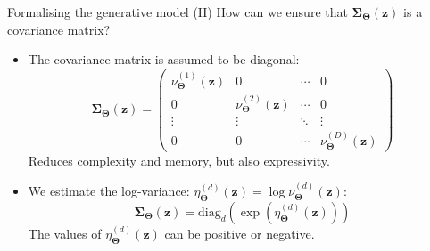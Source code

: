 \documentclass{beamer}
\newcommand{\bs}[1]{\boldsymbol{#1}}
\begin{document}
\begin{frame}{Formalising the generative model (II)}
  How can we ensure that $\bs{\Sigma}_{\bs{\Theta}}(\bs{z})$ is a covariance matrix?
  \begin{itemize}
   \item The covariance matrix is assumed to be diagonal:
   \begin{equation}\bs{\Sigma}_{\bs{\Theta}}(\bs{z}) = \left(\begin{array}{cccc} 
   \nu^{(1)}_{\bs{\Theta}}(\bs{z}) & 0 & \cdots & 0 \\ 
   0 & \nu^{(2)}_{\bs{\Theta}}(\bs{z}) & \cdots & 0 \\
   \vdots & \vdots & \ddots & \vdots \\
   0 & 0 & \cdots & \nu^{(D)}_{\bs{\Theta}}(\bs{z})
   \end{array}\right)\end{equation}
   Reduces complexity and memory, but also expressivity.
   \item We estimate the log-variance: $\eta^{(d)}_{\bs{\Theta}}(\bs{z}) = \log \nu^{(d)}_{\bs{\Theta}}(\bs{z})$:
   \begin{equation}\bs{\Sigma}_{\bs{\Theta}}(\bs{z}) = \textrm{diag}_d \left(\exp \left(\eta^{(d)}_{\bs{\Theta}}(\bs{z})\right)\right)\end{equation}
   The values of $\eta^{(d)}_{\bs{\Theta}}(\bs{z})$ can be positive or negative.
  \end{itemize}
  

\end{frame}
\end{document}
